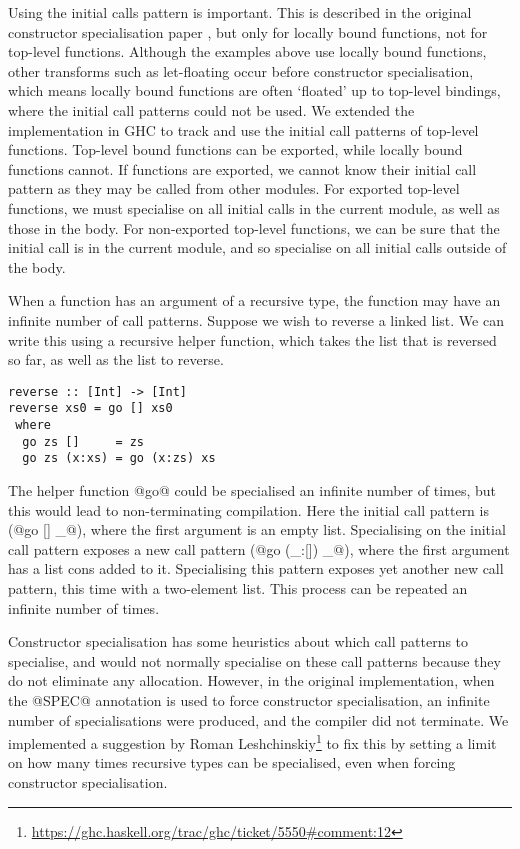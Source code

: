 Using the initial calls pattern is important.
This is described in the original constructor specialisation paper \cite{peyton2007call}, but only for locally bound functions, not for top-level functions.
Although the examples above use locally bound functions, other transforms such as let-floating occur before constructor specialisation, which means locally bound functions are often `floated' up to top-level bindings, where the initial call patterns could not be used.
We extended the implementation in GHC to track and use the initial call patterns of top-level functions.
Top-level bound functions can be exported, while locally bound functions cannot.
If functions are exported, we cannot know their initial call pattern as they may be called from other modules.
For exported top-level functions, we must specialise on all initial calls in the current module, as well as those in the body.
For non-exported top-level functions, we can be sure that the initial call is in the current module, and so specialise on all initial calls outside of the body.


When a function has an argument of a recursive type, the function may have an infinite number of call patterns.
Suppose we wish to reverse a linked list.
We can write this using a recursive helper function, which takes the list that is reversed so far, as well as the list to reverse.

\begin{lstlisting}
reverse :: [Int] -> [Int]
reverse xs0 = go [] xs0
 where
  go zs []     = zs
  go zs (x:xs) = go (x:zs) xs
\end{lstlisting}

The helper function @go@ could be specialised an infinite number of times, but this would lead to non-terminating compilation.
Here the initial call pattern is (@go [] _@), where the first argument is an empty list.
Specialising on the initial call pattern exposes a new call pattern (@go (_:[]) _@), where the first argument has a list cons added to it.
Specialising this pattern exposes yet another new call pattern, this time with a two-element list.
This process can be repeated an infinite number of times.

Constructor specialisation has some heuristics about which call patterns to specialise, and would not normally specialise on these call patterns because they do not eliminate any allocation.
However, in the original implementation, when the @SPEC@ annotation is used to force constructor specialisation, an infinite number of specialisations were produced, and the compiler did not terminate.
We implemented a suggestion by Roman Leshchinskiy\footnote{\url{https://ghc.haskell.org/trac/ghc/ticket/5550\#comment:12}} to fix this by setting a limit on how many times recursive types can be specialised, even when forcing constructor specialisation.


